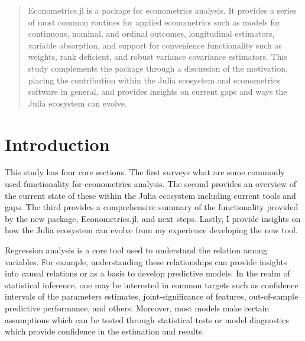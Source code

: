 \documentclass{juliacon}
\begin{document}


\maketitle

\begin{abstract}

Econometrics.jl is a package for econometrics analysis. It provides a series of most common routines for applied econometrics such as models for continuous, nominal, and ordinal outcomes, longitudinal estimators, variable absorption, and support for convenience functionality such as weights, rank deficient, and robust variance covariance estimators. This study complements the package through a discussion of the motivation, placing the contribution within the Julia ecosystem and econometrics software in general, and provides insights on current gaps and ways the Julia ecosystem can evolve.

\end{abstract}

\section{Introduction}

This study has four core sections. The first surveys what are some commonly used functionality for econometrics analysis. The second provides an overview of the current state of these within the Julia \cite{Bezanson_Edelman_Karpinski_Shah_2017} ecosystem including current tools and gaps. The third provides a comprehensive summary of the functionality provided by the new package, Econometrics.jl, and next steps. Lastly, I provide insights on how the Julia ecosystem can evolve from my experience developing the new tool.

Regression analysis is a core tool used to understand the relation among variables. For example, understanding these relationships can provide insights into causal relations or as a basis to develop predictive models. In the realm of statistical inference, one may be interested in common targets such as confidence intervals of the parameters estimates, joint-significance of features, out-of-sample predictive performance, and others. Moreover, most models make certain assumptions which can be tested through statistical tests or model diagnostics which provide confidence in the estimation and results.
\end{document}
